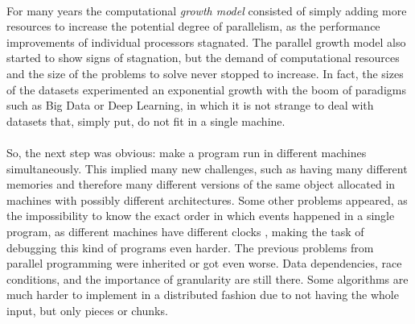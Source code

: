 \\
For many years the computational \textit{growth model} consisted of simply adding more resources to increase the potential degree of parallelism, as the performance improvements of individual processors stagnated. The parallel growth model also started to show signs of stagnation, but the demand of computational resources and the size of the problems to solve never stopped to increase. In fact, the sizes of the datasets experimented an exponential growth with the boom of paradigms such as Big Data or Deep Learning, in which it is not strange to deal with datasets that, simply put, do not fit in a single machine.\\
\\
So, the next step was obvious: make a program run in different machines simultaneously. This implied many new challenges, such as having many different memories and therefore many different versions of the same object allocated in machines with possibly different architectures. Some other problems appeared, as the impossibility to know the exact order in which events happened in a single program, as different machines have different clocks \cite{Lamport}, making the task of debugging this kind of programs even harder. The previous problems from parallel programming were inherited or got even worse. Data dependencies, race conditions, and the importance of granularity are still there. Some algorithms are much harder to implement in a distributed fashion due to not having the whole input, but only pieces or chunks.\\
\\



